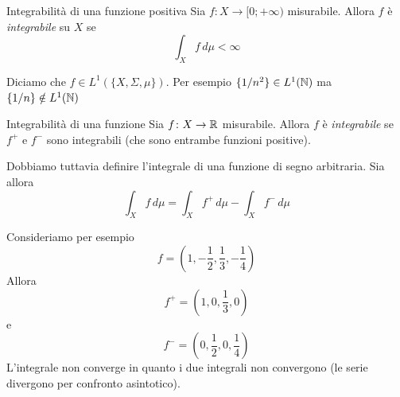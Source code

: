 \documentclass[a4paper]{article}
\begin{document}
\begin{snippetdefinition}{Integrabilità di una funzione positiva}
    Sia \(f\colon X \to [0; +\infty)\) misurabile.
    Allora \(f\) è \emph{integrabile} su \(X\) se
    \[
        \int_X f\,d\mu < \infty
    \]
\end{snippetdefinition}

Diciamo che \(f \in L^1(\{X, \Sigma, \mu\})\).
Per esempio \(\{1/n^2\} \in L^1(\mathbb{N})\) ma \(\{1/n\} \notin L^1(\mathbb{N})\)

\begin{snippetdefinition}{Integrabilità di una funzione}
    Sia \(f\colon X \to \mathbb{R}\) misurabile.
    Allora \(f\) è \emph{integrabile} se \(f^+\) e \(f^-\) sono integrabili (che sono entrambe funzioni positive).
\end{snippetdefinition}

Dobbiamo tuttavia definire l'integrale di una funzione di segno arbitraria. Sia allora
\[
    \int_X f\,d\mu = \int_X f^+\,d\mu - \int_X f^-\,d\mu
\]

Consideriamo per esempio
\[
    f = (1,-\frac{1}{2}, \frac{1}{3}, -\frac{1}{4})
\]
Allora
\[
    f^+ = (1,0, \frac{1}{3}, 0)
\]
e
\[
    f^- = (0,\frac{1}{2}, 0, \frac{1}{4})
\]
L'integrale non converge in quanto i due integrali non convergono (le serie divergono per confronto asintotico).
\end{document}
